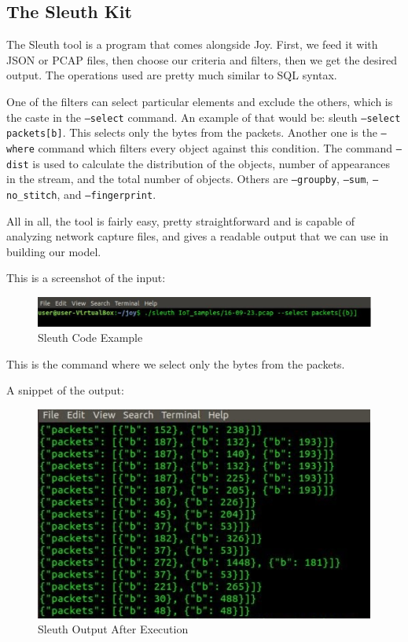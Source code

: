 \documentclass{article}
\begin{document}
\subsection{The Sleuth Kit}
The Sleuth tool is a program that comes alongside Joy. First, we feed it with JSON or PCAP files, then choose our criteria and filters, then we get the desired output. The operations used are pretty much similar to SQL syntax. \newline

One of the filters can select particular elements and exclude the others, which is the caste in the \texttt{--select} command. An example of that would be: sleuth \texttt{--select packets[{b}]}. This selects only the bytes from the packets. Another one is the \texttt{--where} command which filters every object against this condition. The command \texttt{--dist} is used to calculate the distribution of the objects, number of appearances in the stream, and the total number of objects. Others are \texttt{--groupby}, \texttt{--sum}, \texttt{--no\_stitch}, and \texttt{--fingerprint}. \newline

All in all, the tool is fairly easy, pretty straightforward and is capable of analyzing network capture files, and gives a readable output that we can use in building our model. \newline

This is a screenshot of the input:

\begin{figure}[!ht]
    \centering
    \includegraphics[width=15cm]{sleuthCode.PNG}
    \caption{Sleuth Code Example} 
\end{figure}

This is the command where we select only the bytes from the packets.\pagebreak

A snippet of the output: 
\begin{figure}[!ht]
    \centering
    \includegraphics{sleuthOutput.PNG}
    \caption{Sleuth Output After Execution} 
\end{figure}
\end{document}
